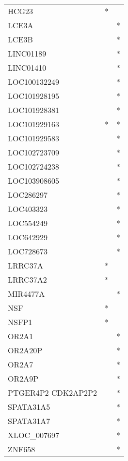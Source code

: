 \begin{tabular}{lcc}
HCG23              &              * &            \\
LCE3A              &                &          * \\
LCE3B              &                &          * \\
LINC01189          &                &          * \\
LINC01410          &                &          * \\
LOC100132249       &                &          * \\
LOC101928195       &                &          * \\
LOC101928381       &                &          * \\
LOC101929163       &              * &          * \\
LOC101929583       &                &          * \\
LOC102723709       &                &          * \\
LOC102724238       &                &          * \\
LOC103908605       &                &          * \\
LOC286297          &                &          * \\
LOC403323          &                &          * \\
LOC554249          &                &          * \\
LOC642929          &                &          * \\
LOC728673          &                &          * \\
LRRC37A            &              * &            \\
LRRC37A2           &              * &            \\
MIR4477A           &                &          * \\
NSF                &              * &            \\
NSFP1              &              * &            \\
OR2A1              &                &          * \\
OR2A20P            &                &          * \\
OR2A7              &                &          * \\
OR2A9P             &                &          * \\
PTGER4P2-CDK2AP2P2 &                &          * \\
SPATA31A5          &                &          * \\
SPATA31A7          &                &          * \\
XLOC\_007697        &                &          * \\
ZNF658             &                &          * \\
\bottomrule
\end{tabular}
